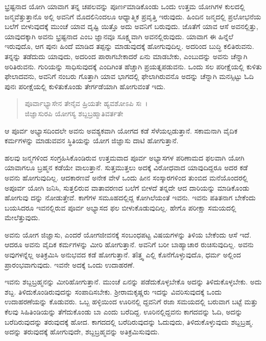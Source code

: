 ಭ್ರಷ್ಟನಾದ ಯೋಗಿ ಯಾವಾಗ ತನ್ನ ಚಪಲವನ್ನು ಪೂರ್ಣಮಾಡಿಕೊಂಡು ಒಂದು ಉತ್ತಮ ಯೋಗಿಗಳ ಕುಲದಲ್ಲಿ ಜನ್ಮವೆತ್ತುತ್ತಾನೊ ಅಲ್ಲಿ ಅವನಿಗೆ ಮೊದಲಿನಿಂದಲೂ ಆಧ್ಯಾತ್ಮಿಕ ಪ್ರವೃತ್ತಿ ಇರುವುದು. ಹಿಂದಿನ ಜನ್ಮದಲ್ಲಿ ಪ್ರಲೋಭನೆಯ ಬಲೆಗೆ ಬೀಳುವುದಕ್ಕೆ ಮುಂಚೆ ಯಾವ ದೃಷ್ಟಿ ಯಿತ್ತೊ ಅದು ಅವನಿಗೆ ಬರುವುದು. ಜೊತೆಗೆ ಯಾವ ಆಸೆ ಅವನಲ್ಲಿತ್ತು, ಯಾವುದಕ್ಕಾಗಿ ಅವನು ಭ್ರಷ್ಟನಾದ ಎಂಬ ಜ್ಞಾನವೂ ಸೂಕ್ಷ್ಮವಾಗಿ ಅವನಲ್ಲಿರುವುದು. ಯಾವಾಗ ಈ ಹಿನ್ನೆಲೆ ಇರುವುದೊ, ಆಗ ಪುನಃ ಹಿಂದೆ ಮಾಡಿದ ತಪ್ಪನ್ನು ಮಾಡುವುದಕ್ಕೆ ಹೋಗುವುದಿಲ್ಲ. ಅದರಿಂದ ಬುದ್ಧಿ ಕಲಿತಿರುವನು. ತನ್ನನ್ನು ತಡೆದುದು ಯಾವುದು, ಅದರಿಂದ ಪಾರಾಗಬೇಕಾದರೆ ಏನು ಮಾಡಬೇಕು, ಎಂಬುದನ್ನು ಅವನು ಚೆನ್ನಾಗಿ ಅರಿತಿರುವನು. ಗುರಿಯನ್ನು ಸಾಧಿಸುವುದಕ್ಕೆ ಎಂದಿಗಿಂತ ಹೆಚ್ಚಾಗಿ ಪ್ರಯತ್ನಪಡುವನು. ಒಂದು ಸಲ ಪರೀಕ್ಷೆಯಲ್ಲಿ ಕುಳಿತು ಫೇಲಾದವನು, ಅವನಿಗೆ ನಂಬರು ಗೊತ್ತಾಗಿ ಯಾವ ಭಾಗದಲ್ಲಿ ಫೇಲಾಗಿರುವನೊ ಅದನ್ನು ಚೆನ್ನಾಗಿ ಮನಸ್ಸಿಟ್ಟು ಓದಿ ಪುನಃ ಪರೀಕ್ಷೆಯಲ್ಲಿ ಕುಳಿತುಕೊಂಡು ತೇರ್ಗಡೆಯಾಗಿ ಹೋಗುವಂತೆ ಇದು.

\begin{verse}
ಪೂರ್ವಾಭ್ಯಾಸೇನ ತೇನೈವ ಹ್ರಿಯತೇ ಹ್ಯವಶೋಽಪಿ ಸಃ~।\\ಜಿಜ್ಞಾಸುರಪಿ ಯೋಗಸ್ಯ ಶಬ್ದಬ್ರಹ್ಮಾತಿವರ್ತತೇ 
\end{verse}

{\small ಆ ಪೂರ್ವ ಅಭ್ಯಾಸದಿಂದಲೇ ಅವನು ಅವಶ್ಯಕವಾಗಿ ಯೋಗದ ಕಡೆ ಸೆಳೆಯಲ್ಪಡುತ್ತಾನೆ. ಸಕಾಮನಾಗಿ ವೈದಿಕ ಕರ್ಮಗಳನ್ನು ಮಾಡುವವನ ಸ್ಥಿತಿಯನ್ನು ಯೋಗ ಜಿಜ್ಞಾಸು ದಾಟಿ ಹೋಗುತ್ತಾನೆ.}

ಹಲವು ಜನ್ಮಗಳಿಂದ ಸಂಗ್ರಹಿಸಿಕೊಂಡಿರುವ ಉತ್ತಮವಾದ ಪೂರ್ವ ಅಭ್ಯಾಸಗಳ ಪರಿಣಾಮದ ಫಲವಾಗಿ ಯೋಗಿ ಯಾವಾಗಲೂ ಬ್ರಹ್ಮನ ಕಡೆಯೇ ವಾಲುತ್ತಾನೆ. ಸುತ್ತಮುತ್ತಲು ಅದಕ್ಕೆ ವಿರೋಧವಾದ ಯಾವುದಿದ್ದರೂ ಅದರ ಕಡೆ ಅವನು ಹೋಗುವುದಿಲ್ಲ. ಆದಕಾರಣವೆ ಅನೇಕ ವೇಳೆ ಒಂದು ಹೀನ ಸಂಸ್ಕಾರಗಳಿಂದ ತುಂಬಿದ ಮನೆಯೊಂದರಲ್ಲಿ ಅಪೂರ್ವ ಯೋಗಿ ಜನಿಸಿ, ಸುತ್ತಲಿರುವ ವಾತಾವರಣದ ಬಲೆಗೆ ಬೀಳದೆ ತನ್ನದೇ ಆದ ದಾರಿಯನ್ನು ಮಾಡಿಕೊಂಡು ಹೋಗುವು ದನ್ನು ನೋಡುತ್ತೇವೆ. ಕಾಗೆಗಳ ಸಮೂಹದಲ್ಲಿದ್ದ ಕೋಗಿಲೆಯಂತೆ ಇವನು. ಇವನು ಪತಿತನಾಗ ಬೇಕೆಂದು ಬಯಸಿದರೂ ಇವನಲ್ಲಿರುವ ಪೂರ್ವ ಅಭ್ಯಾಸದ ಫಲ ಬೀಳುಕೊಡುವುದಿಲ್ಲ. ಹೇಗೊ ಪರೀಕ್ಷಾ ಸಮಯದಲ್ಲಿ ಮೇಲೆತ್ತುವುದು.

ಅವನು ಯೋಗ ಜಿಜ್ಞಾಸು, ಎಂದರೆ ಯೋಗಜೀವನಕ್ಕೆ ಸಂಬಂಧಪಟ್ಟ ವಿಷಯಗಳನ್ನು ತಿಳಿಯ ಬೇಕೆಂದು ಆಸೆ ಇದೆ. ಆದರೂ ಅವನು ವೈದಿಕ ಕರ್ಮಗಳನ್ನು ಮೀರಿ ಹೋಗುತ್ತಾನೆ. ಅವನಿಗೆ ಬರೀ ಬಾಹ್ಯಾಚಾರ ರುಚಿಸುವುದಿಲ್ಲ. ಅವನು ಅವುಗಳನ್ನೆಲ್ಲ ಅತಿಕ್ರಮಿಸಿ ಅನುಭವದ ಕಡೆ ಹೋಗುತ್ತಾನೆ. ತlತ್ತ್ವ ಎಲ್ಲಿ ಕೊನೆಗೊಳ್ಳುವುದೊ, ಧರ್ಮ ಅಲ್ಲಿಂದ ಪ್ರಾರಂಭವಾಗುವುದು. ಇವನೇ ಅದಕ್ಕೆ ಒಂದು ಉದಾಹರಣೆ.

ಇವನು ಶಬ್ದಬ್ರಹ್ಮನನ್ನು ಮೀರಿಹೋಗುತ್ತಾನೆ. ಮುಂಚೆ ಏನನ್ನು ಪಡೆದುಕೊಳ್ಳಬೇಕೊ ಅದನ್ನು ತಿಳಿದುಕೊಳ್ಳಬೇಕು. ಅದು ಶಬ್ದ. ತಿಳಿದುಕೊಂಡಿರುವುದನ್ನು ಸಂಪಾದಿಸಬೇಕು. ಶ‍್ರೀರಾಮಕೃಷ್ಣರು ಇದನ್ನು ವಿವರಿಸುವುದಕ್ಕೆ ಒಂದು ಉದಾಹರಣೆಯನ್ನು ಕೊಡುವರು. ಒಬ್ಬ ಹಳ್ಳಿಯಿಂದ ಊರಿನಲ್ಲಿ ದ್ದವನಿಗೆ ರಜಾ ಸಮಯದಲ್ಲಿ ಬರುವಾಗ ಬಟ್ಟೆ ಮತ್ತು ಕೆಲವು ಸಿಹಿತಿಂಡಿಯನ್ನು ತೆಗೆದುಕೊಂಡು ಬಾ ಎಂದು ಬರೆದಿದ್ದ. ಊರಿನಲ್ಲಿದ್ದವನು ಕಾಗದವನ್ನು ಓದಿ, ಅದನ್ನು ಬರೆದಿರುವುದನ್ನು ತರುವುದಕ್ಕೆ ಹೋದ. ಕಾಗದದಲ್ಲಿ ಬರೆದಿರುವುದನ್ನು ಓದುವುದು, ತಿಳಿದುಕೊಳ್ಳುವುದು ಶಬ್ದಬ್ರಹ್ಮ. ಅದನ್ನು ತರುವುದಕ್ಕೆ ಹೋಗುವುದೇ, ಶಬ್ದಬ್ರಹ್ಮವನ್ನು ಅತಿಕ್ರಮಿಸುವುದು.

